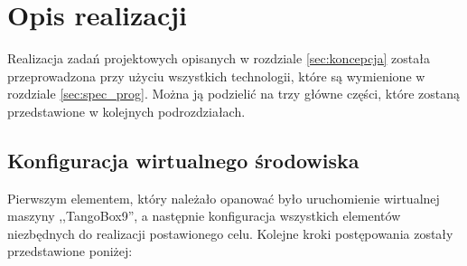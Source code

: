 \clearpage
\section{Opis realizacji}
\label{sec:opis_realizacji}

\quad Realizacja zadań projektowych opisanych w rozdziale \ref{sec:koncepcja} została przeprowadzona przy użyciu wszystkich technologii, które są wymienione w rozdziale \ref{sec:spec_prog}. Można ją podzielić na trzy główne części, które zostaną przedstawione w kolejnych podrozdziałach.

\subsection{Konfiguracja wirtualnego środowiska}
\label{sub:konfiguracja}
\quad Pierwszym elementem, który należało opanować było uruchomienie wirtualnej maszyny ,,TangoBox9'', a następnie konfiguracja wszystkich elementów niezbędnych do realizacji postawionego celu. Kolejne kroki postępowania zostały przedstawione poniżej:

